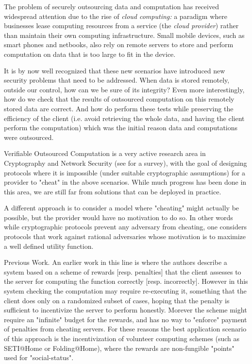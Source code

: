 The problem of securely outsourcing data and computation has received widespread attention due to the rise of {\em cloud computing:} a paradigm where businesses lease computing resources from a service (the {\em cloud provider}) rather than maintain their own computing infrastructure.  Small mobile devices, such as smart phones and netbooks, also rely on remote servers to store and perform computation on data that is too large to fit in the device. 

It is by now well recognized that these new scenarios have introduced new security problems that need to be addressed. When data is stored remotely, outside our control, how can we be sure of its integrity? Even more interestingly, how do we check that the results of outsourced computation on this remotely stored data are correct. And how do perform these tests while preserving the efficiency of the client (i.e. avoid retrieving the whole data, and having the client perform the computation) which was the initial reason data and computations were outsourced. 

{\sf Verifiable Outsourced Computation} is a very active research area in Cryptography and Network Security (see \cite{wb15} for a survey), with the goal of designing protocols where it is impossible (under suitable cryptographic assumptions) for a provider to "cheat" in the above scenarios. While much progress has been done in this area, we are still far from solutions that can be deployed in practice. 

A different approach is to consider a model where "cheating" might actually be possible, but the provider would have no motivation to do so. In other words while cryptographic protocols prevent {\sf any} adversary from cheating, one considers protocols that work against {\sf rational} adversaries whose motivation is to maximize a well defined utility function. 


\smallskip
\noindent
{\sc Previous Work.}
An earlier work in this line is \cite{b08} where the authors describe a system based on a scheme of rewards [resp. penalties] that the client assesses to the server for computing the function correctly [resp. incorrectly]. However in this system checking the computation may require re-executing it, something that the client does only on a randomized subset of cases, hoping that the penalty is sufficient to incentivize the server to perform honestly. Morever the scheme might require an "infinite" budget for the rewards, and has no way to "enforce" payment of penalties from cheating servers. For these reasons the best application scenario of this approach is the incentivization of volunteer computing schemes (such as SETI@Home or Folding@Home), where the rewards are non-fungible "points" used for "social-status". 

